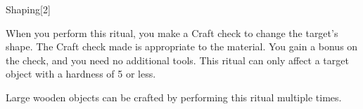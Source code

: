 \begin{spellsection}{Shaping}[2]
    \begin{spellheader}
    \end{spellheader}
    \begin{spellcontent}
        \begin{spelltargetinginfo}
        \end{spelltargetinginfo}
        \begin{spelleffects}
            \spelleffect When you perform this ritual, you make a Craft check to change the target's shape.
            The Craft check made is appropriate to the material.
            You gain a  bonus on the check, and you need no additional tools.
            This ritual can only affect a target object with a hardness of 5 or less.
        \end{spelleffects}
    \end{spellcontent}
    \begin{spellfooter}
        \spellnotes Large wooden objects can be crafted by performing this ritual multiple times.
    \end{spellfooter}
    \begin{spellaugments}
    \end{spellaugments}
\end{spellsection}

